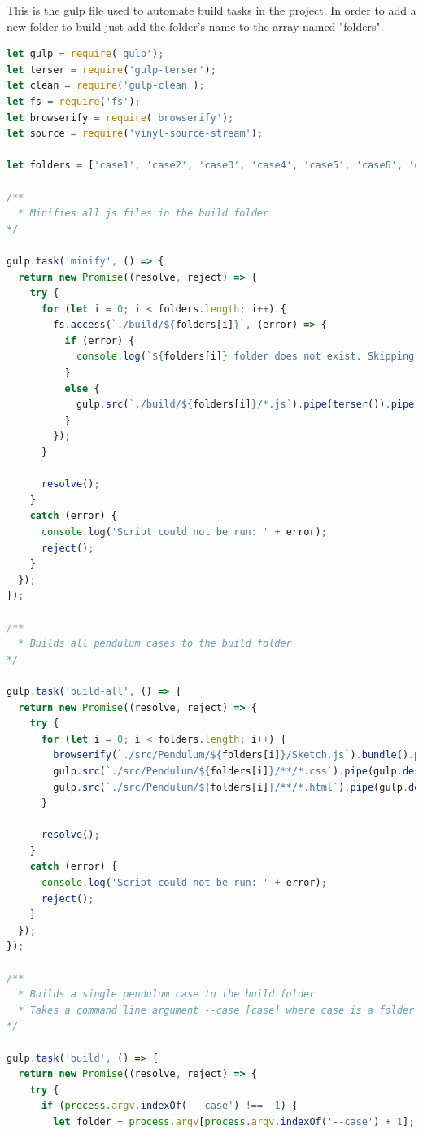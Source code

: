 \documentclass[onecolumn, draftclsnofoot,10pt, compsoc]{IEEEtran}
\begin{document}
This is the gulp file used to automate build tasks in the project. In order to add a new folder to build just add the folder's name to the array named "folders".

\begin{lstlisting}[language=JavaScript]
let gulp = require('gulp');
let terser = require('gulp-terser');
let clean = require('gulp-clean');
let fs = require('fs');
let browserify = require('browserify');
let source = require('vinyl-source-stream');

let folders = ['case1', 'case2', 'case3', 'case4', 'case5', 'case6', 'exploratory'];

/**
  * Minifies all js files in the build folder
*/

gulp.task('minify', () => {
  return new Promise((resolve, reject) => {
    try {
      for (let i = 0; i < folders.length; i++) {
        fs.access(`./build/${folders[i]}`, (error) => {
          if (error) {
            console.log(`${folders[i]} folder does not exist. Skipping...`);
          }
          else {
            gulp.src(`./build/${folders[i]}/*.js`).pipe(terser()).pipe(gulp.dest(`./build/${folders[i]}`), {mode: 0777});
          }
        });
      }

      resolve();
    }
    catch (error) {
      console.log('Script could not be run: ' + error);
      reject();
    }
  });
});

/**
  * Builds all pendulum cases to the build folder
*/

gulp.task('build-all', () => {
  return new Promise((resolve, reject) => {
    try {
      for (let i = 0; i < folders.length; i++) {
        browserify(`./src/Pendulum/${folders[i]}/Sketch.js`).bundle().pipe(source('bundle.js')).pipe(gulp.dest(`./build/${folders[i]}`), {mode: 0777});
        gulp.src(`./src/Pendulum/${folders[i]}/**/*.css`).pipe(gulp.dest(`./build/${folders[i]}`), {mode: 0777});
        gulp.src(`./src/Pendulum/${folders[i]}/**/*.html`).pipe(gulp.dest(`./build/${folders[i]}`), {mode: 0777});
      }

      resolve();
    }
    catch (error) {
      console.log('Script could not be run: ' + error);
      reject();
    }
  });
});

/**
  * Builds a single pendulum case to the build folder
  * Takes a command line argument --case [case] where case is a folder name
*/

gulp.task('build', () => {
  return new Promise((resolve, reject) => {
    try {
      if (process.argv.indexOf('--case') !== -1) {
        let folder = process.argv[process.argv.indexOf('--case') + 1];


\end{lstlisting}
\end{document}
